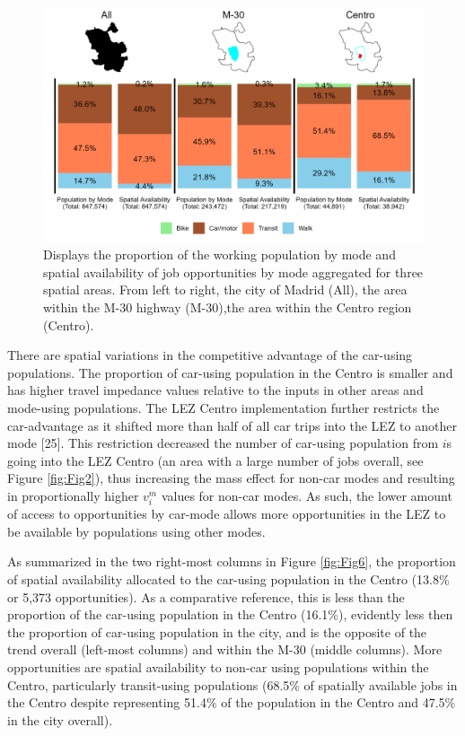 \documentclass[10pt,letterpaper]{article}
\begin{document}
\begin{figure}

{\centering \includegraphics[width=1\linewidth]{images/modal_V_comps_4plot} 

}

\caption{\label{fig:Fig6} Displays the proportion of the working population by mode and spatial availability of job opportunities by mode aggregated for three spatial areas. From left to right, the city of Madrid (All), the area within the M-30 highway (M-30),the area within the Centro region (Centro).}\label{fig:modal-V-comps-plot}
\end{figure}

There are spatial variations in the competitive advantage of the
car-using populations. The proportion of car-using population in the
Centro is smaller and has higher travel impedance values relative to the
inputs in other areas and mode-using populations. The LEZ Centro
implementation further restricts the car-advantage as it shifted more
than half of all car trips into the LEZ to another mode {[}25{]}. This
restriction decreased the number of car-using population from \(i\)s
going into the LEZ Centro (an area with a large number of jobs overall,
see Figure \ref{fig:Fig2}), thus increasing the mass effect for non-car
modes and resulting in proportionally higher \(v_i^m\) values for
non-car modes. As such, the lower amount of access to opportunities by
car-mode allows more opportunities in the LEZ to be available by
populations using other modes.

As summarized in the two right-most columns in Figure \ref{fig:Fig6},
the proportion of spatial availability allocated to the car-using
population in the Centro (13.8\% or 5,373 opportunities). As a
comparative reference, this is less than the proportion of the car-using
population in the Centro (16.1\%), evidently less then the proportion of
car-using population in the city, and is the opposite of the trend
overall (left-most columns) and within the M-30 (middle columns). More
opportunities are spatial availability to non-car using populations
within the Centro, particularly transit-using populations (68.5\% of
spatially available jobs in the Centro despite representing 51.4\% of
the population in the Centro and 47.5\% in the city overall).
\end{document}
